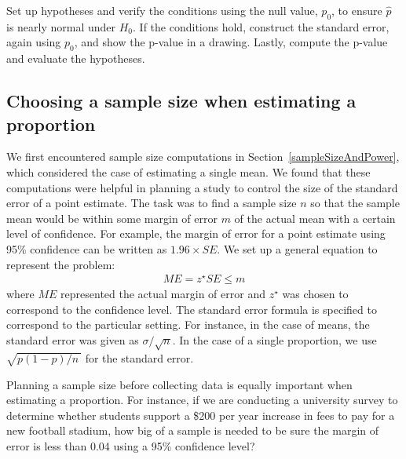\begin{termBox}{
Set up hypotheses and verify the conditions using the null value, $p_0$, to ensure $\hat{p}$ is nearly normal under $H_0$. If the conditions hold, construct the standard error, again using $p_0$, and show the p-value in a drawing. Lastly, compute the p-value and evaluate the hypotheses.}
\end{termBox}



\subsection{Choosing a sample size when estimating a proportion}


We first encountered sample size computations in Section~\ref{sampleSizeAndPower}, which considered the case of estimating a single mean. We found that these computations were helpful in planning a study to control the size of the standard error of a point estimate. The task was to find a sample size $n$ so that the sample mean would be within some margin of error $m$ of the actual mean with a certain level of confidence. For example, the margin of error for a point estimate using 95\% confidence can be written as $1.96\times SE$. We set up a general equation to represent the problem:
\begin{align*}
ME = z^{\star}SE \leq m
\end{align*}
where $ME$ represented the actual margin of error and $z^{\star}$ was chosen to correspond to the confidence level. The standard error formula is specified to correspond to the particular setting. For instance, in the case of means, the standard error was given as $\sigma / \sqrt{n}$. In the case of a single proportion, we use $\sqrt{p(1-p) / n\ }$ for the standard error.

Planning a sample size before collecting data is equally important when estimating a proportion. For instance, if we are conducting a university survey to determine whether students support a \$200 per year increase in fees to pay for a new football stadium, how big of a sample is needed to be sure the margin of error is less than 0.04 using a 95\% confidence level?

